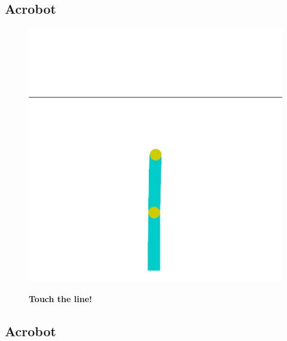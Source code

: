 \documentclass[
  letterpaper,
  DIV=11,
  numbers=noendperiod,
  oneside]{scrartcl}
\begin{document}
\subsection{Acrobot}\label{acrobot}

\begin{figure}

\begin{minipage}{0.65\linewidth}
\includegraphics{figs/acrobot.gif}\end{minipage}%
%
\begin{minipage}{0.35\linewidth}
\textbf{Touch the line!}\end{minipage}%

\end{figure}%

\subsection{Acrobot}\label{acrobot-1}
\end{document}
